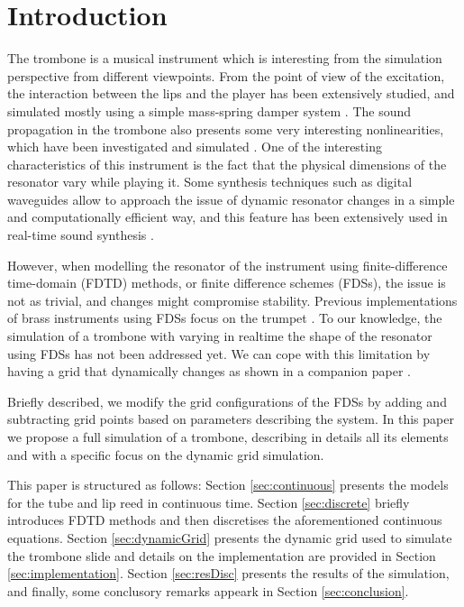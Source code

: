 \section{Introduction}\label{sec:introduction}

The trombone is a musical instrument which is interesting from the simulation perspective from different viewpoints.
From the point of view of the excitation, the interaction between the lips and the player has been extensively studied, and simulated mostly using a simple mass-spring damper system \cite{campbell2004brass}.
The sound propagation in the trombone also presents some very interesting nonlinearities, which have been investigated and simulated
\cite{campbell2004brass, msallam1997physical,msallam2000physical}.
One of the interesting characteristics of this instrument is the fact that the physical dimensions of the resonator vary while playing it.
Some synthesis techniques such as digital waveguides allow to approach the issue of dynamic resonator changes in a simple and computationally efficient way, and this feature has been extensively used in real-time sound synthesis \cite{cook2002real}.

However, when modelling the resonator of the instrument using finite-difference time-domain (FDTD) methods, or finite difference schemes (FDSs), the issue is not as trivial, and changes might compromise stability.
Previous implementations of brass instruments using FDSs focus on the trumpet 
 \cite{harrison2015environment}. To our knowledge, the simulation of a trombone with varying in realtime the shape of the resonator using FDSs has not been addressed yet.
We can cope with this limitation  by having a grid that 
 dynamically changes as shown in a companion paper \cite{Willemsen2021}.

Briefly described, we modify the grid configurations of the FDSs by adding and subtracting grid points based on parameters describing the system.
In this paper we propose a full simulation of a trombone, describing in details all its elements and with a specific focus on the dynamic grid simulation.

This paper is structured as follows: Section \ref{sec:continuous} presents the models for the tube and lip reed in continuous time. Section \ref{sec:discrete} briefly introduces FDTD methods and then discretises the aforementioned continuous equations. Section \ref{sec:dynamicGrid} presents the dynamic grid used to simulate the trombone slide and details on the implementation are provided in Section \ref{sec:implementation}. Section \ref{sec:resDisc} presents the results of the simulation, and finally, some conclusory remarks appeark in Section \ref{sec:conclusion}.